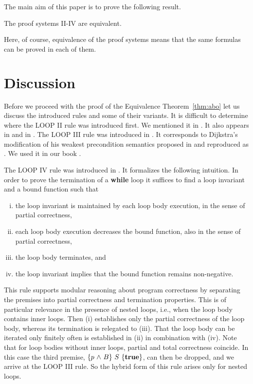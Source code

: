 \documentclass[manuscript, screen, review]{acmart}
\begin{document}
The main aim of this paper is to prove the following result.

\begin{theorem}[Equivalence] \label{thm:abo}
The proof systems II-IV are equivalent.  
\end{theorem}

Here, of course, equivalence of the proof systems means that the same
formulas can be proved in each of them.



\section{Discussion}
\label{sec:discussion}

Before we proceed with the proof of the Equivalence Theorem~\ref{thm:abo} let us
discuss the introduced rules and some of their variants.  It is
difficult to determine where the LOOP II rule was introduced first. We
mentioned it in \cite{ABO90}. It also appears in \cite[page 64]{Rey98}
and in \cite[page 151]{Almeida11}.  The LOOP III rule was introduced
in \cite{OG76a}.  It corresponds to Dijkstra's modification of his
weakest precondition semantics proposed in \cite{EWD:EWD573} and
reproduced as %
\cite{EWD:EWD573pub}.  We used it in our book \cite{ABO09}.

The LOOP IV rule was introduced in \cite{ABO25}.
It formalizes the following intuition. In order to prove the
termination of a \textbf{while} loop it suffices to find a loop
invariant and a bound function such that

\begin{enumerate}[(i)]
 \item the loop invariant is maintained by each loop body execution, 
       in the sense of partial correctness,
 \item each loop body execution decreases the bound function, 
       also in the sense of partial correctness,
 \item the loop body terminates, and
 \item the loop invariant implies that the bound function remains non-negative.
\end{enumerate}

This rule supports modular reasoning about program correctness
by separating the premises into partial correctness and termination
properties.  This is of particular relevance in the presence of nested
loops, i.e., when the loop body contains inner loops.  Then (i)
establishes only the partial correctness of the loop body, whereas its
termination is relegated to (iii). That the loop body can be iterated
only finitely often is established in (ii) in combination with (iv).
Note that for loop bodies without inner loops, partial and total
correctness coincide. In this case the third premise,
$\mbox{$\{{p \mbox{$\ \wedge\ $} B}\}\ {S}\ \{{\mathbf{true}}\}$}$, can then be dropped, and we arrive at
the LOOP III rule. So the hybrid form of this rule arises only for
nested loops.
\end{document}

